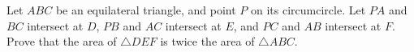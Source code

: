 Let $ABC$ be an equilateral triangle, and point $P$ on its circumcircle. Let $PA$ and $BC$ intersect at $D$, $PB$ and $AC$ intersect at $E$, and $PC$ and $AB$ intersect at $F$. Prove that the area of $\triangle DEF$ is twice the area of $\triangle ABC$.